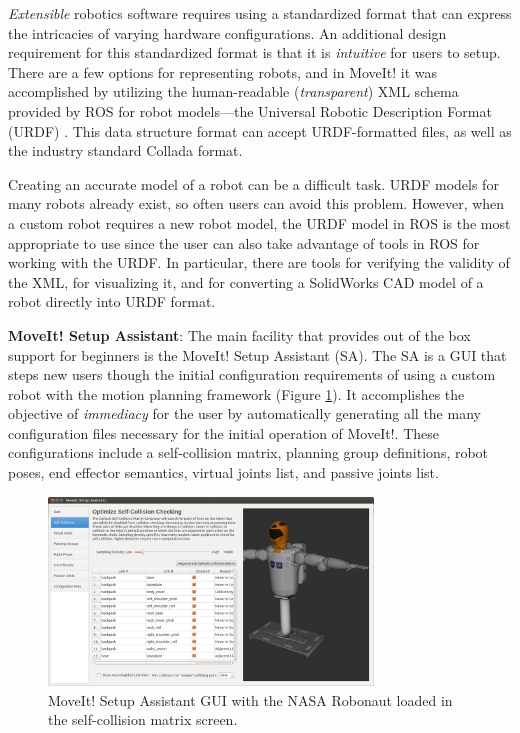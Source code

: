 \documentclass[10pt,journal,compsoc]{joser1}
\begin{document}
{\textit{Extensible} robotics software requires using a standardized format that can express the intricacies of varying hardware configurations. An additional design requirement for this standardized format is that it is \textit{intuitive} for users to setup. There are a few options for representing robots, and in MoveIt! it was accomplished by utilizing the human-readable (\textit{transparent}) XML schema provided by ROS for robot models---the Universal Robotic Description Format (URDF) \cite{urdf}. This data structure format can accept URDF-formatted files, as well as the industry standard Collada \cite{collada} format. 

Creating an accurate model of a robot can be a difficult task. URDF models for many robots already exist, so often users can avoid this problem. However, when a custom robot requires a new robot model, the URDF model in ROS is the most appropriate to use since the user can also take advantage of tools in ROS for working with the URDF. In particular, there are tools for verifying the validity of the XML, for visualizing it, and for converting a SolidWorks CAD model of a robot directly into URDF format. 

{\bf MoveIt! Setup Assistant}: The main facility that provides out of the box support for beginners is the MoveIt! Setup Assistant (SA). The SA is a GUI that steps new users though the initial configuration requirements of using a custom robot with the motion planning framework (Figure \ref{fig:setupassistant}). It accomplishes the objective of \textit{immediacy} for the user by automatically generating all the many configuration files necessary for the initial operation of MoveIt!. These configurations include a self-collision matrix, planning group definitions, robot poses, end effector semantics, virtual joints list, and passive joints list. 

\begin{figure}[!t]
\centering
\includegraphics[width=3.4in]{images/setup_assistant}
\caption{MoveIt! Setup Assistant GUI with the NASA Robonaut loaded in the self-collision matrix screen.}
\label{fig:setupassistant}
\end{figure}

}
\end{document}
